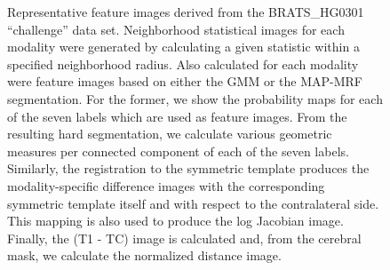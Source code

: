 \documentclass[final,5p,times,twocolumn]{elsarticle}
\begin{document}
\begin{figure}[htb]
  \centering
  \caption{Representative feature images derived from the 
           BRATS\_HG0301  ``challenge'' data set.
           Neighborhood statistical images for each modality were 
           generated by calculating a given statistic within
           a specified neighborhood radius.  Also calculated for each modality were feature
           images based on either the GMM or the MAP-MRF segmentation.  For the former, we
           show the probability maps for each of the seven labels which are used as feature
           images.  From the resulting hard segmentation, we calculate various geometric 
           measures per connected component of each of the seven labels.  Similarly, the 
           registration to the symmetric template produces the modality-specific 
           difference images with the
           corresponding symmetric template itself and with respect to the 
           contralateral side.   
           This mapping is also used to produce the log Jacobian image.  Finally, the 
           (T1 - TC) image is calculated and, from the
           cerebral mask, we calculate the normalized distance image.  
           }
  \label{fig:featureImages}         
\end{figure}
\end{document}
